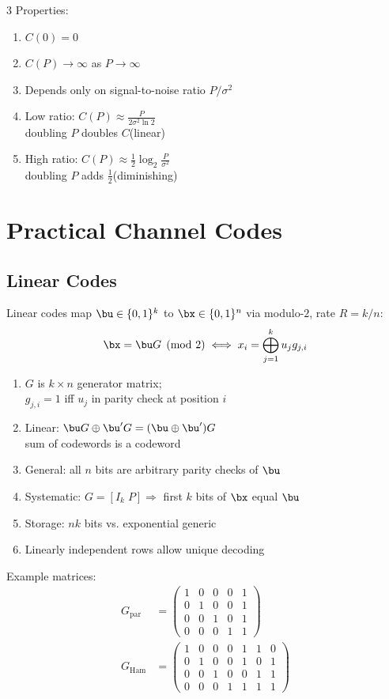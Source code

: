 \documentclass[12pt, a4paper]{article}
\begin{document}
\begin{multicols*}{3}
Properties:
\begin{enumerate}[\roman*.]
  \item $C(0)=0$
  \item $C(P)\to\infty$ as $P\to\infty$
  \item Depends only on signal-to-noise ratio $P/\sigma^2$
  \item Low ratio: $C(P)\approx\tfrac{P}{2\sigma^2\ln 2}$\\doubling $P$ doubles $C$\hfill(linear)
  \item High ratio: $C(P)\approx\tfrac{1}{2}\log_2\tfrac{P}{\sigma^2}$\\doubling $P$ adds $\tfrac{1}{2}$\hfill(diminishing)
\end{enumerate}
\colbreak
\colbreak
\section{Practical Channel Codes}
\subsection{Linear Codes}
Linear codes map $\bu\in\{0,1\}^k$ to $\bx\in\{0,1\}^n$ via modulo-$2$, rate $R=k/n$:
\begin{align*}
  \bx=\bu G\pmod{2}\iff x_i=\bigoplus_{j=1}^k u_j g_{j,i}
\end{align*}
\begin{enumerate}[\roman*.]
  \item $G$ is $k\times n$ generator matrix;\;\\$g_{j,i}=1$ iff $u_j$ in parity check at position $i$
  \item Linear: $\bu G\oplus\bu'G=(\bu\oplus\bu')G$\\sum of codewords is a codeword
  \item General: all $n$ bits are arbitrary parity checks of $\bu$
  \item Systematic: $G=[I_k\;P]\Rightarrow$ first $k$ bits of $\bx$ equal $\bu$
  \item Storage: $nk$ bits vs. exponential generic
  \item Linearly independent rows allow unique decoding
\end{enumerate}

Example matrices:
\begin{align*}
  G_{\text{par}}&=\begin{pmatrix}
    1&0&0&0&1\\
    0&1&0&0&1\\
    0&0&1&0&1\\
    0&0&0&1&1
  \end{pmatrix}\\
  G_{\text{Ham}}&=\begin{pmatrix}
    1&0&0&0&1&1&0\\
    0&1&0&0&1&0&1\\
    0&0&1&0&0&1&1\\
    0&0&0&1&1&1&1
  \end{pmatrix}
\end{align*}


\end{multicols*}
\end{document}
